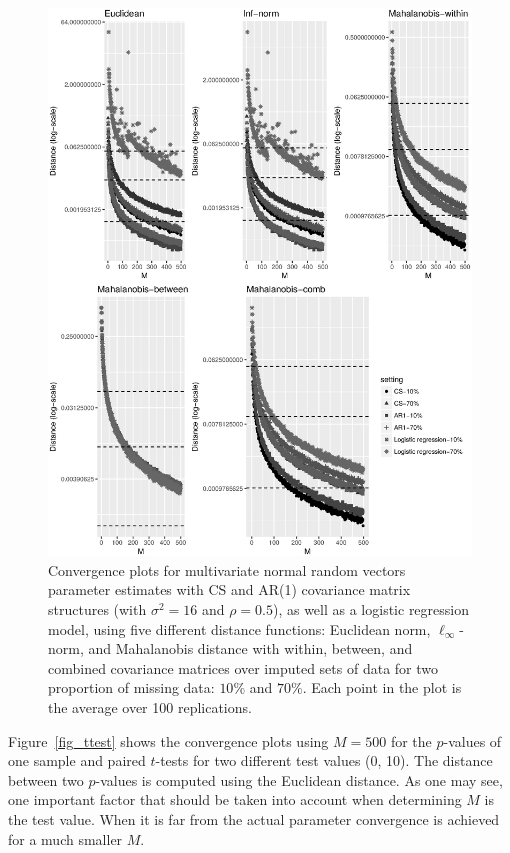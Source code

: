 \documentclass[11pt,a5paper,twoside]{book}
\begin{document}
{{\begin{figure}
	\centering
	\includegraphics[width=\textwidth]{figMMest.eps}
	\caption[Convergence plots for multivariate normal random vectors parameter estimates with CS and AR(1) covariance matrix structures]{Convergence plots for multivariate normal random vectors parameter estimates with CS and AR(1) covariance matrix structures (with $\sigma^2=16$ and $\rho=0.5$), as well as a logistic regression model, using five different distance functions: Euclidean norm, $\ell_{\infty}$-norm, and Mahalanobis distance with within, between, and combined covariance matrices over imputed sets of data for two proportion of missing data: $10\%$ and $70\%$. Each point in the plot is the average over 100 replications. {\color{black}{The three horizontal dashed lines are $\epsilon = 0.05, 0.01, 0.001$, respectively.}}}
	\label{fig_mvn}
\end{figure} 


Figure~\ref{fig_ttest} shows the convergence plots using $M=500$ for the $p$-values of one sample and paired $t$-tests for two different test values (0, 10). The distance between two $p$-values is computed using the Euclidean distance. As one may see, one important factor that should be taken into account when determining $M$ is the test value. When it is far from the actual parameter convergence is achieved for a much smaller $M$. 

}}
\end{document}
